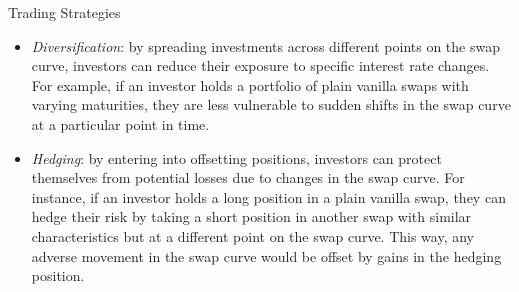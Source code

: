 \documentclass{beamer}
\begin{document}
%

\begin{frame}{Trading Strategies}
\begin{itemize}
\item \emph{Diversification}: by spreading investments across different points on the swap curve, investors can reduce their exposure to specific interest rate changes. For example, if an investor holds a portfolio of plain vanilla swaps with varying maturities, they are less vulnerable to sudden shifts in the swap curve at a particular point in time.
\item \emph{Hedging}: by entering into offsetting positions, investors can protect themselves from potential losses due to changes in the swap curve. For instance, if an investor holds a long position in a plain vanilla swap, they can hedge their risk by taking a short position in another swap with similar characteristics but at a different point on the swap curve. This way, any adverse movement in the swap curve would be offset by gains in the hedging position.
\end{itemize}
\end{frame}
\end{document}
